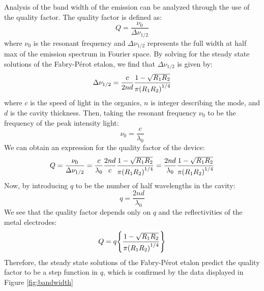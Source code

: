 \documentclass{report}
\begin{document}
            Analysis of the band width of the emission can be analyzed through the use of the quality factor. The quality factor is defined as:
            \begin{equation}
                Q=\frac{\nu_0}{\Delta\nu_{1/2}}
            \end{equation}
            where $\nu_0$ is the resonant frequency and $\Delta\nu_{1/2}$ represents the full width at half max of the emission spectrum in Fourier space.\cite{joseph1995laser} By solving for the steady state solutions of the Fabry-P\'erot etalon, we find that $\Delta\nu_{1/2}$ is given by:
            \begin{equation}
                \Delta\nu_{1/2}=\frac{c}{2nd}\frac{1-\sqrt{R_1R_2}}{\pi\qty(R_1R_2)^{1/4}}
            \end{equation}
            where $c$ is the speed of light in the organics, $n$ is integer describing the mode, and $d$ is the cavity thickness.\cite{joseph1995laser} Then, taking the resonant frequency $\nu_0$ to be the frequency of the peak intensity light:
            \begin{equation}
                \nu_0=\frac{c}{\lambda_0}
            \end{equation}
            We can obtain an expression for the quality factor of the device:
            \begin{equation}
                Q=\frac{\nu_0}{\Delta\nu_{1/2}}=\frac{c}{\lambda_0}\frac{2nd}{c}\frac{1-\sqrt{R_1R_2}}{\pi\qty(R_1R_2)^{1/4}}=\frac{2nd}{\lambda_0}\frac{1-\sqrt{R_1R_2}}{\pi\qty(R_1R_2)^{1/4}}
            \end{equation}
            Now, by introducing $q$ to be the number of half wavelengths in the cavity:
            \begin{equation}
                q=\frac{2nd}{\lambda_0}
            \end{equation}
            We see that the quality factor depends only on $q$ and the reflectivities of the metal electrodes:
            \begin{equation}
                Q=q\qty{\frac{1-\sqrt{R_1R_2}}{\pi\qty(R_1R_2)^{1/4}}}
                \label{eq:Q(q)}
            \end{equation}
            Therefore, the steady state solutions of the Fabry-P\'erot etalon predict the quality factor to be a step function in $q$, which is confirmed by the data displayed in Figure \ref{fig:bandwidth}
\end{document}
